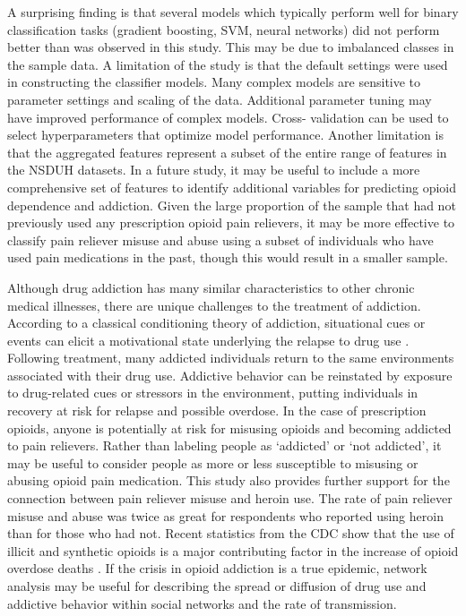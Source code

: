\documentclass[sigconf]{acmart}
\begin{document}

A surprising finding is that several models which typically perform well for 
binary classification tasks (gradient boosting, SVM, neural networks) did not 
perform better than was observed in this study. This may be due to imbalanced 
classes in the sample data. A limitation of the study is that the default 
settings were used in constructing the classifier models. Many complex models 
are sensitive to parameter settings and scaling of the data. Additional 
parameter tuning may have improved performance of complex models. Cross-
validation can be used to select hyperparameters that optimize model 
performance. Another limitation is that the aggregated features represent a 
subset of the entire range of features in the NSDUH datasets. In a future study, 
it may be useful to include a more comprehensive set of features to identify 
additional variables for predicting opioid dependence and addiction. 
Given the large proportion of the sample that had not previously used any
prescription opioid pain relievers, it may be more effective to classify 
pain reliever misuse and abuse using a subset of individuals who have used 
pain medications in the past, though this would result in a smaller sample.


Although drug addiction has many similar characteristics to other chronic 
medical illnesses, there are unique challenges to the treatment of addiction. 
According to a classical conditioning theory of addiction, situational cues or 
events can elicit a motivational state underlying the relapse to drug use
\cite{shaham03}. Following treatment, many addicted individuals return to the 
same environments associated with their drug use. Addictive behavior can be 
reinstated by exposure to drug-related cues or stressors in the environment,
putting individuals in recovery at risk for relapse and possible overdose. 
In the case of prescription opioids, anyone is potentially at risk for misusing 
opioids and becoming addicted to pain relievers. Rather than labeling people 
as `addicted' or `not addicted', it may be useful to consider people as more or 
less susceptible to misusing or abusing opioid pain medication. This study also 
provides further support for the connection between pain reliever misuse and 
heroin use. The rate of pain reliever misuse and abuse was twice as great for
respondents who reported using heroin than for those who had not. Recent 
statistics from the CDC show that the use of illicit and synthetic opioids is
a major contributing factor in the increase of opioid overdose deaths 
\cite{cdc18}. If the crisis in opioid addiction is a true epidemic, network 
analysis may be useful for describing the spread or diffusion of drug use and 
addictive behavior within social networks and the rate of transmission. 
\end{document}
